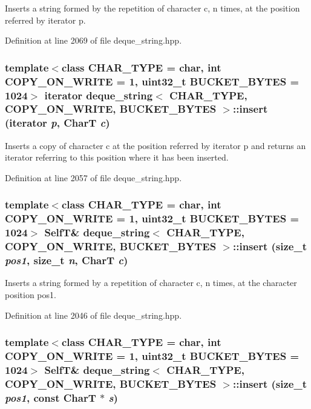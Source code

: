 Inserts a string formed by the repetition of character c, n times, at the position referred by iterator p. 

Definition at line 2069 of file deque\_\-string.hpp.\hypertarget{classdeque__string_78045a454b744aec347592e03d1c9afc}{
\subsubsection[{insert}]{\setlength{\rightskip}{0pt plus 5cm}template$<$class CHAR\_\-TYPE  = char, int COPY\_\-ON\_\-WRITE = 1, uint32\_\-t BUCKET\_\-BYTES = 1024$>$ iterator {\bf deque\_\-string}$<$ CHAR\_\-TYPE, COPY\_\-ON\_\-WRITE, BUCKET\_\-BYTES $>$::insert (iterator {\em p}, \/  CharT {\em c})}}
\label{classdeque__string_78045a454b744aec347592e03d1c9afc}


Inserts a copy of character c at the position referred by iterator p and returns an iterator referring to this position where it has been inserted. 

Definition at line 2057 of file deque\_\-string.hpp.\hypertarget{classdeque__string_f6733b1f605197c2d81b2c5422726b9c}{
\subsubsection[{insert}]{\setlength{\rightskip}{0pt plus 5cm}template$<$class CHAR\_\-TYPE  = char, int COPY\_\-ON\_\-WRITE = 1, uint32\_\-t BUCKET\_\-BYTES = 1024$>$ {\bf SelfT}\& {\bf deque\_\-string}$<$ CHAR\_\-TYPE, COPY\_\-ON\_\-WRITE, BUCKET\_\-BYTES $>$::insert (size\_\-t {\em pos1}, \/  size\_\-t {\em n}, \/  CharT {\em c})}}
\label{classdeque__string_f6733b1f605197c2d81b2c5422726b9c}


Inserts a string formed by a repetition of character c, n times, at the character position pos1. 

Definition at line 2046 of file deque\_\-string.hpp.\hypertarget{classdeque__string_2b8514eee08029ac4330f119595618b9}{
\subsubsection[{insert}]{\setlength{\rightskip}{0pt plus 5cm}template$<$class CHAR\_\-TYPE  = char, int COPY\_\-ON\_\-WRITE = 1, uint32\_\-t BUCKET\_\-BYTES = 1024$>$ {\bf SelfT}\& {\bf deque\_\-string}$<$ CHAR\_\-TYPE, COPY\_\-ON\_\-WRITE, BUCKET\_\-BYTES $>$::insert (size\_\-t {\em pos1}, \/  const CharT $\ast$ {\em s})}}
\label{classdeque__string_2b8514eee08029ac4330f119595618b9}


